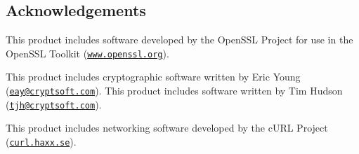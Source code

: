\subsection*{Acknowledgements}

This product includes software developed by the OpenSSL Project for use in the OpenSSL Toolkit (\href{http://www.openssl.org/}{\tt www.openssl.org}).

This product includes cryptographic software written by Eric Young (\href{mailto:eay@cryptsoft.com}{\tt eay@cryptsoft.com}). This product includes software written by Tim Hudson (\href{mailto:tjh@cryptsoft.com}{\tt tjh@cryptsoft.com}).

This product includes networking software developed by the cURL Project (\href{http://curl.haxx.se/}{\tt curl.haxx.se}). 